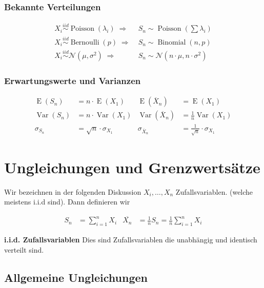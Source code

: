 \documentclass[25pt]{sciposter}
\newcommand{\Var}{\operatorname{Var}}
\newcommand{\E}{\operatorname{E}}
\newcommand{\mc}{\mathcal}
\begin{document}
\begin{multicols}{3}
\subsubsection*{Bekannte Verteilungen}
\begin{align*}
X_i \overset{iid}{\sim} \operatorname{Poisson}(\lambda_i) \; \Rightarrow & \; S_n \sim \operatorname{Poisson}({\textstyle \sum \lambda_i}) \\
X_i \overset{iid}{\sim} \operatorname{Bernoulli}(p) \; \Rightarrow & \; S_n \sim \operatorname{Binomial}(n,p)\\
X_i \overset{iid}{\sim} \mc N(\mu, \sigma^2) \; \Rightarrow & \; S_n \sim \mc N(n \cdot \mu, n \cdot \sigma^2)
\end{align*}
\subsubsection*{Erwartungswerte und Varianzen}
\begin{align*}
\E(S_n) &= n \cdot \E(X_1) & \E(\overline{X}_n) &= \E(X_1) \\
\Var(S_n) &= n \cdot \Var(X_1) & \Var(\overline{X}_n) &= \tfrac{1}{n} \Var(X_1) \\
\sigma_{S_n} &= \sqrt{n} \cdot \sigma_{X_1} & \sigma_{\overline{X}_n} &= \tfrac{1}{\sqrt{n}} \cdot \sigma_{X_1}
\end{align*}



\section{Ungleichungen und Grenzwertsätze}

Wir bezeichnen in der folgenden Diskussion $X_i, \ldots, X_n$ Zufallsvariablen. (welche meistens i.i.d sind). Dann definieren wir

\begin{align*}
	S_n &= \sum_{i=1}^{n} X_i & \overline{X_n} &= \frac{1}{n}S_n = \frac{1}{n}\sum_{i=1}^{n}X_i
\end{align*}

\textbf{i.i.d. Zufallsvariablen} Dies sind Zufallsvariablen die unabhängig und identisch verteilt sind. 

\subsection*{Allgemeine Ungleichungen}


\end{multicols}
\end{document}
